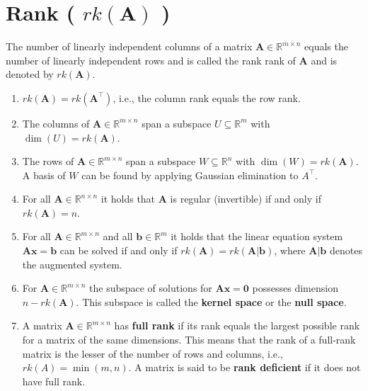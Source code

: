 \section{Rank ( $rk(\mathbf{A})$ ) \cite{mfml-1}}\label{matrix: Rank}

The number of linearly independent columns of a matrix $\mathbf{A} \in \mathbb{R}^{m \times n}$ equals the number of linearly independent rows and is called the rank rank of $\mathbf{A}$ and is denoted by $rk(\mathbf{A})$.

\begin{enumerate}
    \item $rk(\mathbf{A}) = rk(\mathbf{A}^\top)$, i.e., the column rank equals the row rank.

    \item The columns of $\mathbf{A} \in \mathbb{R}^{m \times n}$ span a subspace $U \subseteq \mathbb{R}^m$ with $\dim(U) = rk(\mathbf{A})$. 

    \item The rows of $\mathbf{A} \in \mathbb{R}^{m\times n}$ span a subspace $W \subseteq \mathbb{R}^n$ with $\dim(W) = rk(\mathbf{A})$. A basis of $W$ can be found by applying Gaussian elimination to $A^\top$.

    \item For all $\mathbf{A} \in \mathbb{R}^{n\times n}$ it holds that $\mathbf{A}$ is regular (invertible) if and only if $rk(\mathbf{A}) = n$.

    \item For all $\mathbf{A} \in \mathbb{R}^{m\times n}$ and all $\mathbf{b} \in \mathbb{R}^m$ it holds that the linear equation system $\mathbf{Ax = b}$ can be solved if and only if $rk(\mathbf{A}) = rk(\mathbf{A}|\mathbf{b})$, where $\mathbf{A}|\mathbf{b}$ denotes the augmented system.

    \item For $\mathbf{A} \in \mathbb{R}^{m\times n}$ the subspace of solutions for $\mathbf{Ax = 0}$ possesses dimension $n - rk(\mathbf{A})$. This subspace is called the \textbf{kernel space} or the \textbf{null space}.

    \item A matrix $\mathbf{A} \in \mathbb{R}^{m\times n}$ has \textbf{full rank} if its rank equals the largest possible rank for a matrix of the same dimensions. This means that the rank of a full-rank matrix is the lesser of the number of rows and columns, i.e., $rk(A) = \min(m, n)$. A matrix is said to be \textbf{rank deficient} if it does not have full rank.

\end{enumerate}


